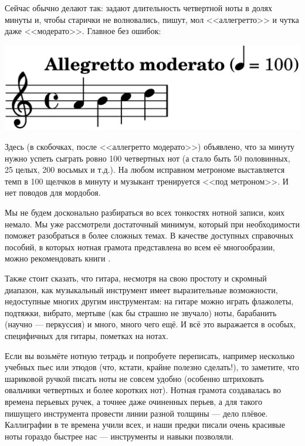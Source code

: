 Сейчас обычно делают так: задают длительность четвертной ноты в долях минуты и, чтобы старички не волновались, пишут, мол <<аллегретто>> и чутка даже <<модерато>>. Главное без ошибок:
\begin{center}
    \includegraphics{fig/notes/tempo}
\end{center}

Здесь (в скобочках, после <<аллегретто модерато>>) объявлено, что за минуту нужно успеть сыграть ровно 100 четвертных нот (а стало быть 50 половинных, 25 целых, 200 восьмых и т.д.). На любом исправном метрономе выставляется темп в 100 щелчков в минуту и музыкант тренируется <<под метроном>>. И нет поводов для мордобоя. 

Мы не будем досконально разбираться во всех тонкостях нотной записи, коих немало. Мы уже рассмотрели достаточный минимум, который при необходимости поможет разобраться в более сложных темах. В качестве доступных справочных пособий, в которых нотная грамота представлена во всем её многообразии, можно рекомендовать книги \cite{bib:alekseev:MusicTheory,bib:vahromeev:Theory}.

Также стоит сказать, что гитара, несмотря на свою простоту и скромный диапазон, как музыкальный инструмент имеет выразительные возможности, недоступные многих другим инструментам: на гитаре можно играть флажолеты, подтяжки, вибрато, мертыве (как бы страшно не звучало) ноты, барабанить (научно --- перкуссия) и много, много чего ещё. И всё это выражается в особых, специфичных для гитары, пометках на нотах.

Если вы возьмёте нотную тетрадь и попробуете переписать, например несколько учебных пьес или этюдов (что, кстати, крайне полезно сделать!), то заметите, что шариковой ручкой писать ноты не совсем удобно (особенно штриховать овальчики четвертных и более коротких нот). Нотная грамота создавалась во времена перьевых ручек, а точнее даже очиненных перьев, а для такого пишущего инструмента провести линии разной толщины --- дело плёвое. Каллиграфии в те времена учили всех, и наши предки писали очень красивые ноты гораздо быстрее нас --- инструменты и навыки позволяли.

